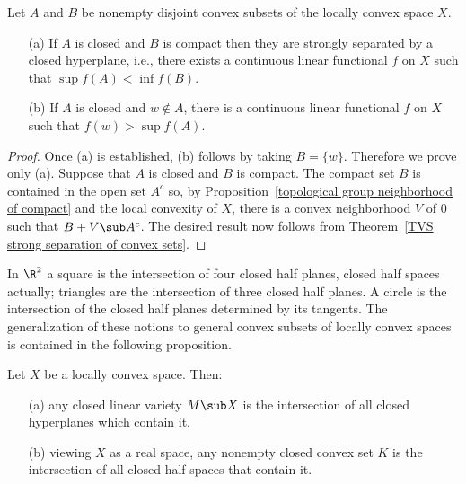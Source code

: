 \begin{theorem}\label{LCS separation of closed and compact convex sets}
Let $A$ and $B$ be nonempty disjoint convex subsets of the locally convex space $X$.
\begin{itemize}
\item[(a)] If $A$ is closed and $B$ is compact then they are strongly separated by a closed hyperplane, i.e., there exists a continuous linear functional $f$ on $X$ such that $\sup f(A)<\inf f(B)$.
\item[(b)] If $A$ is closed and $w\notin A$, there is a continuous linear functional $f$ on $X$ such that $f(w)>\sup f(A)$.
\end{itemize}
\end{theorem}
\begin{proof}
Once (a) is established, (b) follows by taking $B=\{w\}$. Therefore we prove only (a). Suppose that $A$ is closed and $B$ is compact. The compact set $B$ is contained in the open set $A^c$ so, by Proposition~\ref{topological group neighborhood of compact} and the local convexity of $X$, there is a convex neighborhood $V$ of $0$ such that $B+V\sub A^c$. The desired result now follows from Theorem~\ref{TVS strong separation of convex sets}.
\end{proof}
In $\R^2$ a square is the intersection of four closed half planes, closed half spaces actually; triangles are the intersection of three closed half planes. A circle is the intersection of the closed half planes determined by its tangents. The generalization of these notions to general convex subsets of locally convex spaces is contained in the following proposition.
\begin{proposition}\label{LCS intersection of hyperplane and half plane}
Let $X$ be a locally convex space. Then:
\begin{itemize}
\item[(a)] any closed linear variety $M\sub X$ is the intersection of all closed hyperplanes which contain it.
\item[(b)] viewing $X$ as a real space, any nonempty closed convex set $K$ is the intersection of all closed half spaces that contain it.
\end{itemize}
\end{proposition}

